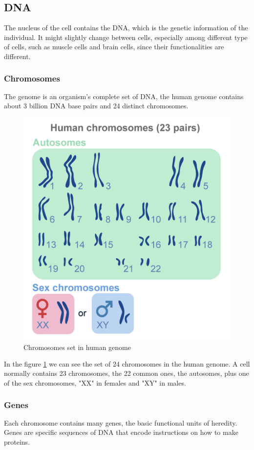 \subsection{DNA}
The nucleus of the cell contains the DNA, which is the genetic information of the individual. It might slightly change between cells, especially among different type of cells, such as muscle cells and brain cells, since their functionalities are different.
\subsubsection{Chromosomes}
The genome is an organism's complete set of DNA, the human genome contains about 3 billion DNA base pairs and 24 distinct chromosomes. 

\begin{figure}[h]
	\includegraphics[scale=0.8]{res/proteins_overview/chromosomes.png}
	\caption{Chromosomes set in human genome}
	\label{fig:chromosomes}
\end{figure}

In the figure \ref{fig:chromosomes} we can see the set of 24 chromosomes in the human genome. A cell normally contains 23 chromosomes, the 22 common ones, the autosomes, plus one of the sex chromosomes, "XX" in females and "XY" in males.
\subsubsection{Genes}
Each chromosome contains many genes, the basic functional units of heredity. Genes are specific sequences of DNA that encode instructions on how to make proteins.


